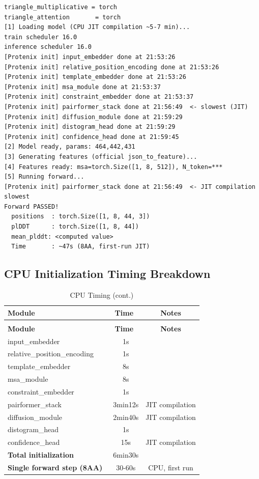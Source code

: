 \documentclass[12pt,a4paper]{article}
\begin{document}
\begin{verbatim}
triangle_multiplicative = torch
triangle_attention       = torch
[1] Loading model (CPU JIT compilation ~5-7 min)...
train scheduler 16.0
inference scheduler 16.0
[Protenix init] input_embedder done at 21:53:26
[Protenix init] relative_position_encoding done at 21:53:26
[Protenix init] template_embedder done at 21:53:26
[Protenix init] msa_module done at 21:53:37
[Protenix init] constraint_embedder done at 21:53:37
[Protenix init] pairformer_stack done at 21:56:49  <- slowest (JIT)
[Protenix init] diffusion_module done at 21:59:29
[Protenix init] distogram_head done at 21:59:29
[Protenix init] confidence_head done at 21:59:45
[2] Model ready, params: 464,442,431
[3] Generating features (official json_to_feature)...
[4] Features ready: msa=torch.Size([1, 8, 512]), N_token=***
[5] Running forward...
[Protenix init] pairformer_stack done at 21:56:49  <- JIT compilation slowest
Forward PASSED!
  positions  : torch.Size([1, 8, 44, 3])
  plDDT      : torch.Size([1, 8, 44])
  mean_plddt: <computed value>
  Time       : ~47s (8AA, first-run JIT)
\end{verbatim}

\subsection{CPU Initialization Timing Breakdown}

\begin{longtable}{lcc}
    \caption{CPU Model Initialization Timing Breakdown} \\
    \toprule
    \textbf{Module} & \textbf{Time} & \textbf{Notes} \\
    \midrule
    \endfirsthead
    \caption[]{CPU Timing (cont.)} \\
    \toprule
    \textbf{Module} & \textbf{Time} & \textbf{Notes} \\
    \midrule
    \endhead
    \bottomrule
    \endfoot
    \endlastfoot

    input_embedder & ~1s & \\
    relative_position_encoding & ~1s & \\
    template_embedder & ~8s & \\
    msa_module & ~8s & \\
    constraint_embedder & ~1s & \\
    pairformer_stack & ~3min12s & JIT compilation \\
    diffusion_module & ~2min40s & JIT compilation \\
    distogram_head & ~1s & \\
    confidence_head & ~15s & JIT compilation \\
    \midrule
    \textbf{Total initialization} & ~6min30s & \\
    \textbf{Single forward step (8AA)} & ~30-60s & CPU, first run \\
\end{longtable}
\end{document}
